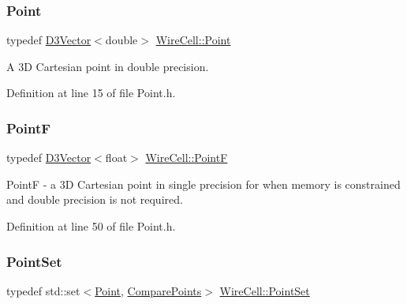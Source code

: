 \mbox{\label{namespace_wire_cell_ab2b2565fa6432efbb4513c14c988cda9}} 
\subsubsection{\texorpdfstring{Point}{Point}}
{\footnotesize\ttfamily typedef \hyperlink{class_wire_cell_1_1_d3_vector}{D3\+Vector}$<$double$>$ \hyperlink{namespace_wire_cell_ab2b2565fa6432efbb4513c14c988cda9}{Wire\+Cell\+::\+Point}}



A 3D Cartesian point in double precision. 



Definition at line 15 of file Point.\+h.

\mbox{\label{namespace_wire_cell_a5ec8176c29cc534839f348e55e50b7f1}} 
\subsubsection{\texorpdfstring{PointF}{PointF}}
{\footnotesize\ttfamily typedef \hyperlink{class_wire_cell_1_1_d3_vector}{D3\+Vector}$<$float$>$ \hyperlink{namespace_wire_cell_a5ec8176c29cc534839f348e55e50b7f1}{Wire\+Cell\+::\+PointF}}

PointF -\/ a 3D Cartesian point in single precision for when memory is constrained and double precision is not required. 

Definition at line 50 of file Point.\+h.

\mbox{\label{namespace_wire_cell_ab4baa470f96cef6cf5eef6601d4ee6ad}} 
\subsubsection{\texorpdfstring{Point\+Set}{PointSet}}
{\footnotesize\ttfamily typedef std\+::set$<$\hyperlink{namespace_wire_cell_ab2b2565fa6432efbb4513c14c988cda9}{Point}, \hyperlink{struct_wire_cell_1_1_compare_points}{Compare\+Points}$>$ \hyperlink{namespace_wire_cell_ab4baa470f96cef6cf5eef6601d4ee6ad}{Wire\+Cell\+::\+Point\+Set}}



